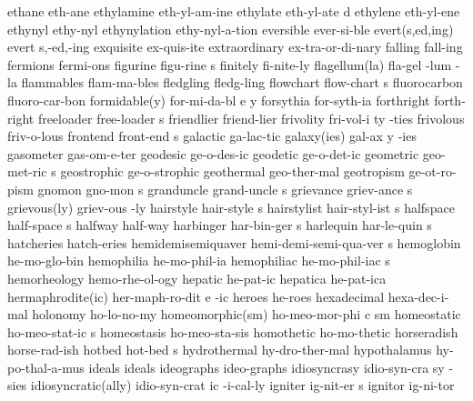 \1 ethane		eth-ane			%
\1 ethylamine		eth-yl-am-ine		%
\5 ethylate		eth-yl-ate d		%
\1 ethylene		eth-yl-ene
\1 ethynyl		ethy-nyl		%
\1 ethynylation		ethy-nyl-a-tion		%
\1 eversible		ever-si-ble
\2 evert(s,ed,ing)	evert s,-ed,-ing
\1 exquisite		ex-quis-ite
\1 extraordinary	ex-tra-or-di-nary
\1 falling		fall-ing		%
\1 fermions		fermi-ons
\5 figurine		figu-rine s		%
\1 finitely		fi-nite-ly		%
\3 flagellum(la)	fla-gel -lum -la
\1 flammables		flam-ma-bles
\1 fledgling		fledg-ling
\5 flowchart		flow-chart s
\1 fluorocarbon		fluoro-car-bon		%
\3 formidable(y)	for-mi-da-bl e y
\1 forsythia		for-syth-ia
\1 forthright		forth-right
\5 freeloader		free-loader s
\1 friendlier		friend-lier
\6 frivolity		fri-vol-i ty -ties
\1 frivolous		friv-o-lous
\NewWordtrue
\5 frontend		front-end s		%
\1 galactic		ga-lac-tic
\3 galaxy(ies)		gal-ax y -ies
\1 gasometer		gas-om-e-ter
\1 geodesic		ge-o-des-ic
\1 geodetic		ge-o-det-ic
\5 geometric		geo-met-ric s
\1 geostrophic          ge-o-strophic		%
\1 geothermal		geo-ther-mal		%
\1 geotropism		ge-ot-ro-pism
\5 gnomon		gno-mon s
\5 granduncle		grand-uncle s		%
\5 grievance		griev-ance s
\2 grievous(ly) 	griev-ous -ly
\5 hairstyle		hair-style s
\5 hairstylist		hair-styl-ist s
\5 halfspace		half-space s            %
\1 halfway		half-way		%
\5 harbinger		har-bin-ger s
\5 harlequin		har-le-quin s
\1 hatcheries		hatch-eries
\5 hemidemisemiquaver	hemi-demi-semi-qua-ver s	%
\1 hemoglobin		he-mo-glo-bin
\1 hemophilia		he-mo-phil-ia
\5 hemophiliac		he-mo-phil-iac s	%
\1 hemorheology 	hemo-rhe-ol-ogy
\1 hepatic		he-pat-ic
\1 hepatica		he-pat-ica		%
\3 hermaphrodite(ic)	her-maph-ro-dit e -ic
\1 heroes		he-roes
\1 hexadecimal		hexa-dec-i-mal
\1 holonomy		ho-lo-no-my
\3 homeomorphic(sm)	ho-meo-mor-phi c sm	%
\5 homeostatic		ho-meo-stat-ic s	%
\1 homeostasis		ho-meo-sta-sis		%
\1 homothetic		ho-mo-thetic
\1 horseradish		horse-rad-ish
\5 hotbed		hot-bed s		%
\1 hydrothermal		hy-dro-ther-mal		%
\1 hypothalamus 	hy-po-thal-a-mus 
\1 ideals		ideals
\1 ideographs		ideo-graphs
\6 idiosyncrasy 	idio-syn-cra sy -sies
\3 idiosyncratic(ally)	idio-syn-crat ic -i-cal-ly
\5 igniter		ig-nit-er s
\1 ignitor		ig-ni-tor
